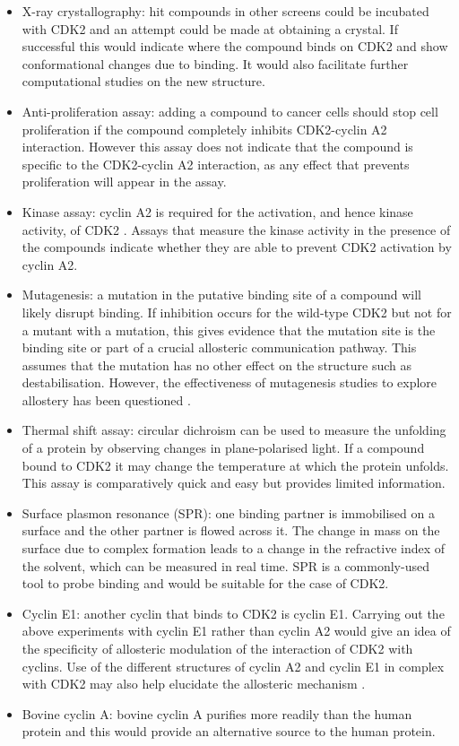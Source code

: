 \begin{itemize}
\item X-ray crystallography: hit compounds in other screens could be incubated with CDK2 and an attempt could be made at obtaining a crystal.
If successful this would indicate where the compound binds on CDK2 and show conformational changes due to binding.
It would also facilitate further computational studies on the new structure.
\item Anti-proliferation assay: adding a compound to cancer cells should stop cell proliferation if the compound completely inhibits CDK2-cyclin A2 interaction.
However this assay does not indicate that the compound is specific to the CDK2-cyclin A2 interaction, as any effect that prevents proliferation will appear in the assay.
\item Kinase assay: cyclin A2 is required for the activation, and hence kinase activity, of CDK2 \cite{Jeffrey1995}.
Assays that measure the kinase activity in the presence of the compounds indicate whether they are able to prevent CDK2 activation by cyclin A2.
\item Mutagenesis: a mutation in the putative binding site of a compound will likely disrupt binding.
If inhibition occurs for the wild-type CDK2 but not for a mutant with a mutation, this gives evidence that the mutation site is the binding site or part of a crucial allosteric communication pathway.
This assumes that the mutation has no other effect on the structure such as destabilisation.
However, the effectiveness of mutagenesis studies to explore allostery has been questioned \cite{Tang2017}.
\item Thermal shift assay: circular dichroism can be used to measure the unfolding of a protein by observing changes in plane-polarised light.
If a compound bound to CDK2 it may change the temperature at which the protein unfolds.
This assay is comparatively quick and easy but provides limited information.
\item Surface plasmon resonance (SPR): one binding partner is immobilised on a surface and the other partner is flowed across it.
The change in mass on the surface due to complex formation leads to a change in the refractive index of the solvent, which can be measured in real time.
SPR is a commonly-used tool to probe binding and would be suitable for the case of CDK2.
\item Cyclin E1: another cyclin that binds to CDK2 is cyclin E1.
Carrying out the above experiments with cyclin E1 rather than cyclin A2 would give an idea of the specificity of allosteric modulation of the interaction of CDK2 with cyclins.
Use of the different structures of cyclin A2 and cyclin E1 in complex with CDK2 may also help elucidate the allosteric mechanism \cite{Honda2005}.
\item Bovine cyclin A: bovine cyclin A purifies more readily than the human protein \cite{Jeffrey1995} and this would provide an alternative source to the human protein.

\end{itemize}

